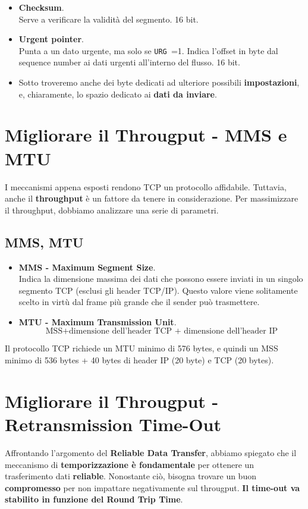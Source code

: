 \begin{itemize}
	\item \textbf{Checksum}.\\
	Serve a verificare la validità del segmento. 16 bit.
	
	\item \textbf{Urgent pointer}.\\
	Punta a un dato urgente, ma solo se \verb|URG |=1. Indica l'offset in byte dal sequence number ai dati urgenti all'interno del flusso. 16 bit.
	
	\item Sotto troveremo anche dei byte dedicati ad ulteriore possibili \textbf{impostazioni}, e, chiaramente, lo spazio dedicato ai \textbf{dati da inviare}.
\end{itemize}


\newpage

\section{Migliorare il Througput - MMS e MTU}
I meccanismi appena esposti rendono TCP un protocollo affidabile. Tuttavia, anche il \textbf{throughput} è un fattore da tenere in considerazione. Per massimizzare il throughput, dobbiamo analizzare una serie di parametri.

\subsection{MMS, MTU}
\begin{itemize}
	\item \textbf{MMS - Maximum Segment Size}.\\
	Indica la dimensione massima dei dati che possono essere inviati in un singolo segmento TCP (esclusi gli header TCP/IP). Questo valore viene solitamente scelto in virtù dal frame più grande che il sender può trasmettere. 
	
	\item \textbf{MTU - Maximum Transmission Unit}.
	$$\text{MSS} + \text{dimensione dell'header TCP + dimensione dell'header IP}$$
	
\end{itemize}

Il protocollo TCP richiede un MTU minimo di 576 bytes, e quindi un MSS minimo di 536 bytes + 40 bytes di header IP (20 byte) e TCP (20 bytes).

\section{Migliorare il Througput - Retransmission Time-Out}
Affrontando l'argomento del \textbf{Reliable Data Transfer}, abbiamo spiegato che il meccanismo di \textbf{temporizzazione è fondamentale} per ottenere un trasferimento dati \textbf{reliable}. Nonostante ciò, bisogna trovare un buon \textbf{compromesso} per non impattare negativamente sul througput. \textbf{Il time-out va stabilito in funzione del Round Trip Time}.


